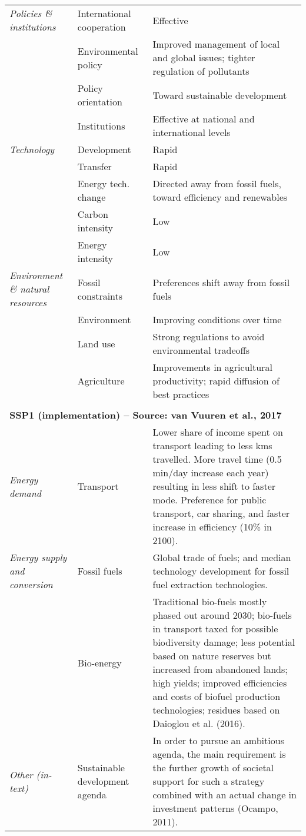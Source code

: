 {\begin{longtable}{p{3cm}p{3.5cm}p{8cm}}
\textit{Policies \& institutions} & International cooperation & Effective\\
\textit{} & Environmental policy & Improved management of local and global issues; tighter regulation of pollutants\\
\textit{} & Policy orientation & Toward sustainable development\\
\textit{} & Institutions & Effective at national and international levels\\
\textit{Technology} & Development & Rapid\\
\textit{} & Transfer & Rapid\\
\textit{} & Energy tech. change & Directed away from fossil fuels, toward efficiency and renewables\\
\textit{} & Carbon intensity & Low\\
\textit{} & Energy intensity & Low\\
\textit{Environment \& natural resources} & Fossil constraints & Preferences shift away from fossil fuels\\
\textit{} & Environment & Improving conditions over time\\
\textit{} & Land use & Strong regulations to avoid environmental tradeoffs\\
\textit{} & Agriculture & Improvements in agricultural productivity; rapid diffusion of best practices\\ && \\
\multicolumn{3}{l}{\textbf{SSP1 (implementation) -- Source: van Vuuren et al., 2017}}\\
\textit{Energy demand} & Transport & Lower share of income spent on transport leading to less kms travelled. More travel time (0.5 min/day increase each year) resulting in less shift to faster mode. Preference for public transport, car sharing, and faster increase in efficiency (10\% in 2100).\\
\textit{Energy supply and conversion} & Fossil fuels & Global trade of fuels; and median technology development for fossil fuel extraction technologies.\\
\textit{} & Bio-energy & Traditional bio-fuels mostly phased out around 2030; bio-fuels in transport taxed for possible biodiversity damage; less potential based on nature reserves but increased from abandoned lands; high yields; improved efficiencies and costs of biofuel production technologies; residues based on Daioglou et al. (2016).\\
\textit{Other (in-text)} & Sustainable development agenda & In order to pursue an ambitious agenda, the main requirement is the further growth of societal support for such a strategy combined with an actual change in investment patterns (Ocampo, 2011).\\

\end{longtable}}
